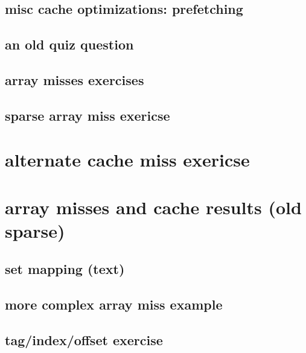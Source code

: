 \subsection{misc cache optimizations: prefetching}


\subsection{an old quiz question}


\subsection{array misses exercises}

\subsection{sparse array miss exericse}


\section{alternate cache miss exericse}


\section{array misses and cache results (old sparse)}


\subsection{set mapping (text)}


%

\subsection{more complex array miss example}


\subsection{tag/index/offset exercise}
